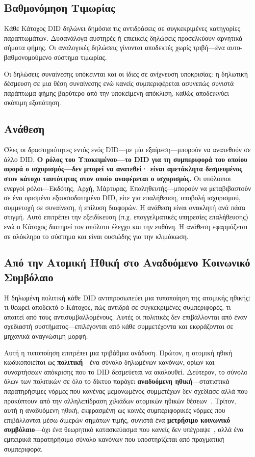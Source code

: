 \documentclass[11pt,a4paper,twocolumn]{article}
\begin{document}
\subsection{Βαθμονόμηση Τιμωρίας}

Κάθε Κάτοχος DID δηλώνει δημόσια τις αντιδράσεις σε συγκεκριμένες κατηγορίες παραπτωμάτων. Δυσανάλογα αυστηρές ή επιεικείς δηλώσεις προσελκύουν αρνητικά σήματα φήμης. Οι αναλογικές δηλώσεις γίνονται αποδεκτές χωρίς τριβή---ένα αυτο-βαθμονομούμενο σύστημα τιμωρίας.

Οι δηλώσεις συναίνεσης υπόκεινται και οι ίδιες σε ανίχνευση υποκρισίας: η δηλωτική δέσμευση σε μια θέση συναίνεσης ενώ κανείς συμπεριφέρεται ασυνεπώς συνιστά παράπτωμα φήμης βαρύτερο από την υποκείμενη απόκλιση, καθώς αποδεικνύει σκόπιμη εξαπάτηση.

\subsection{Ανάθεση}

Όλες οι δραστηριότητες εντός ενός DID---με μία εξαίρεση---μπορούν να ανατεθούν σε άλλο DID. \textbf{Ο ρόλος του Υποκειμένου---το DID για τη συμπεριφορά του οποίου αφορά ο ισχυρισμός---δεν μπορεί να ανατεθεί· είναι αμετάκλητα δεσμευμένος στον κάτοχο ταυτότητας στον οποίο αναφέρεται ο ισχυρισμός.} Οι υπόλοιποι ενεργοί ρόλοι---Εκδότης, Αρχή, Μάρτυρας, Επαληθευτής---μπορούν να μεταβιβαστούν σε ένα ορισμένο εξουσιοδοτημένο DID, είτε για επαλήθευση, υποβολή ισχυρισμού, συμμετοχή σε συναίνεση, ή επίλυση διαφορών. Η ανάθεση είναι ανακλητή ανά πάσα στιγμή. Αυτό επιτρέπει την εξειδίκευση (π.χ. επαγγελματικές υπηρεσίες επαλήθευσης) ενώ ο Κάτοχος διατηρεί τον απόλυτο έλεγχο και την ευθύνη. Η ανάθεση εφαρμόζεται σε ολόκληρο το σύστημα και είναι ουσιώδης για την κλιμάκωση.

\subsection{Από την Ατομική Ηθική στο Αναδυόμενο Κοινωνικό Συμβόλαιο}

Η δηλωμένη πολιτική κάθε DID αντιπροσωπεύει μια τυποποίηση της ατομικής ηθικής: τι θεωρεί αποδεκτό ο Κάτοχος, πώς αντιδρά σε συγκεκριμένες συμπεριφορές, τι απαιτεί από τους αντισυμβαλλομένους. Αυτές οι πολιτικές δεν επιβάλλονται από έναν σχεδιαστή συστήματος---επιλέγονται από κάθε συμμετέχοντα και εκφράζονται σε μηχανικά αναγνώσιμη μορφή.

Αυτή η τυποποίηση επιτρέπει μια τριβάθμια ανάδυση. Πρώτον, η ατομική ηθική κωδικοποιείται ως \textbf{πολιτική}---ένα σύνολο δηλωμένων κανόνων, ορίων και συναρτήσεων απόκρισης που το DID δεσμεύεται να ακολουθεί. Δεύτερον, το σύνολο όλων των πολιτικών σε όλο το δίκτυο παράγει \textbf{αναδυόμενη ηθική}---στατιστικά παρατηρήσιμες νόρμες που κανένας μεμονωμένος συμμετέχων δεν σχεδίασε αλλά που προκύπτουν από την αλληλεπίδραση χιλιάδων ατομικών ηθικών θέσεων~\cite{durkheim1893}. Τρίτον, αυτή η αναδυόμενη ηθική, εκφρασμένη ως κοινές συμπεριφορικές νόρμες που επιβάλλονται μέσω διμερών σημάτων τιμής, συνιστά ένα \textbf{μετρήσιμο κοινωνικό συμβόλαιο}---όχι ένα θεωρητικό κατασκεύασμα που κανείς δεν υπέγραψε~\cite{rawls1971}, αλλά ένα εμπειρικά παρατηρήσιμο σύνολο κανόνων που υποστηρίζεται από πραγματική συμπεριφορά.
\end{document}

